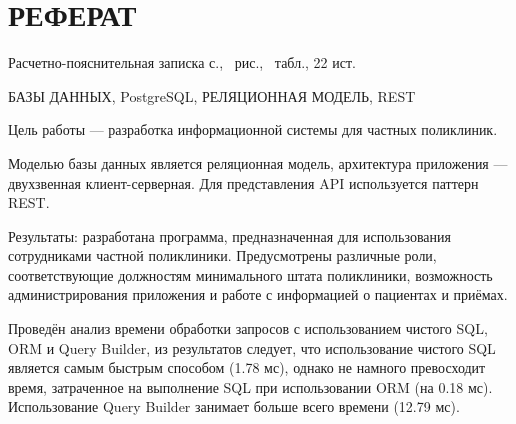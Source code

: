 \section*{\large РЕФЕРАТ}

Расчетно-пояснительная записка \pageref{LastPage} с., \totalfigures\ рис., \totaltables\ табл., 22 ист.

БАЗЫ ДАННЫХ, PostgreSQL, РЕЛЯЦИОННАЯ МОДЕЛЬ, REST


Цель работы --- разработка информационной системы для частных поликлиник.

Моделью базы данных является реляционная модель, архитектура приложения --- двухзвенная клиент-серверная.
Для представления API используется паттерн REST.

Результаты: разработана программа, предназначенная для использования сотрудниками частной поликлиники. Предусмотрены различные роли, соответствующие должностям минимального штата поликлиники, возможность администрирования приложения и работе с информацией о пациентах и приёмах.

Проведён анализ времени обработки запросов с использованием чистого SQL, ORM и Query Builder, из результатов следует, что использование чистого SQL является самым быстрым способом (1.78 мс), однако не намного превосходит время, затраченное на выполнение SQL при использовании ORM (на 0.18 мс). Использование Query Builder занимает больше всего времени (12.79 мс).

\pagebreak